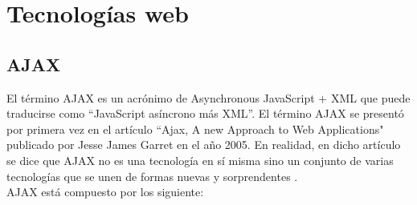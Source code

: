 %

\section{Tecnologías web}


\subsection{AJAX}

El término AJAX es un acrónimo de Asynchronous JavaScript $+$ XML que puede traducirse como ``JavaScript asíncrono más XML''. El término AJAX se presentó por primera vez en el artículo ``Ajax, A new Approach to Web Applications" publicado por Jesse James Garret en el año 2005. En realidad, en dicho artículo se dice que AJAX no es una tecnología en sí misma sino un conjunto de varias tecnologías que se unen de formas nuevas y sorprendentes \cite{ajax_dummies_2006}.\\

AJAX está compuesto por los siguiente:

